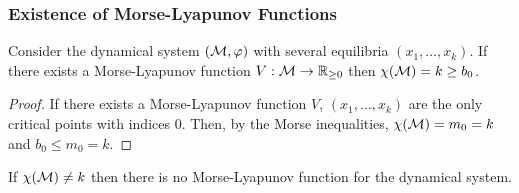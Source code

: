 \begin{frame}
    \frametitle{Existence of Morse-Lyapunov Functions}

    \begin{corollary}
        Consider the dynamical system $(\mathcal{M}, \varphi)$ with several
        equilibria $(x_1, \ldots, x_k)$. If there exists a Morse-Lyapunov
        function $V: \mathcal{M} \rightarrow \mathbb{R}_{\geq 0}$ then $\chi(\mathcal{M})
        = k \geq b_0$.
    \end{corollary}

    \begin{proof}
        If there exists a Morse-Lyapunov function $V$, $(x_1, \ldots, x_k)$ are
        the only critical points with indices $0$. Then, by the Morse
        inequalities, $\chi(\mathcal{M}) = m_0 = k$ and $b_0 \leq m_0 = k$.
    \end{proof}

    \begin{rem}
        If $\chi(\mathcal{M}) \neq k$ then there is no Morse-Lyapunov function for
        the dynamical system.
    \end{rem}
\end{frame}

\endgroup